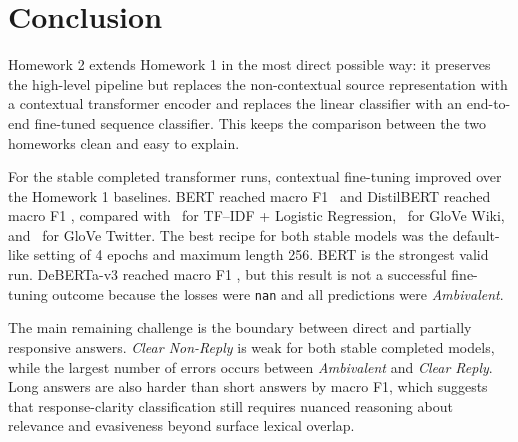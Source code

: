 \clearpage
\section{Conclusion}

Homework 2 extends Homework 1 in the most direct possible way: it preserves the high-level pipeline but replaces the non-contextual source representation with a contextual transformer encoder and replaces the linear classifier with an end-to-end fine-tuned sequence classifier. This keeps the comparison between the two homeworks clean and easy to explain.

For the stable completed transformer runs, contextual fine-tuning improved over the Homework 1 baselines. BERT reached macro F1 \bertf\ and DistilBERT reached macro F1 \distilbertf, compared with \hwonebestf\ for TF--IDF + Logistic Regression, \hwonewikitwo\ for GloVe Wiki, and \hwonetwitter\ for GloVe Twitter. The best recipe for both stable models was the default-like setting of 4 epochs and maximum length 256. BERT is the strongest valid run. DeBERTa-v3 reached macro F1 \debertaf, but this result is not a successful fine-tuning outcome because the losses were \texttt{nan} and all predictions were \emph{Ambivalent}.

The main remaining challenge is the boundary between direct and partially responsive answers. \emph{Clear Non-Reply} is weak for both stable completed models, while the largest number of errors occurs between \emph{Ambivalent} and \emph{Clear Reply}. Long answers are also harder than short answers by macro F1, which suggests that response-clarity classification still requires nuanced reasoning about relevance and evasiveness beyond surface lexical overlap.

\clearpage




